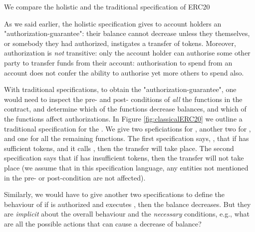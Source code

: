  
We compare the holistic and the traditional specification of ERC20

As we said earlier,  the holistic specification gives to account holders an
 "authorization-guarantee": their balance cannot decrease unless they
 themselves, or somebody they had authorized, instigates a transfer of
 tokens. Moreover, authorization is {\em not} transitive: only the
 account holder can authorise some other party to transfer funds from
 their account: authorisation to spend from an account does not confer
 the ability to authorise yet more others to spend also.
 
 With traditional  specifications, to obtain the "authorization-guarantee", 
one would need to inspect the pre- and post- conditions of {\em all} the functions
in the contract, and determine which of the functions decrease balances, and which of the functions 
 affect authorizations.
In Figure \ref{fig:classicalERC20} we outline a traditional specification for the .
We give two speficiations for , another two for , and one for all 
the remaining functions. The  first specification says, \eg, that if  
  has sufficient tokens, and it calls , then the transfer will take place.  
The second specification says that  if  has insufficient tokens, then 
the transfer will not take place (we assume that in this
specification language, any entities not mentioned in the pre- or post-condition 
are not affected).
 
 Similarly, we would have to give another two specifications to define the behaviour of 
if  is authorized and executes , then   the balance decreases. 
But they are {\em implicit} about the overall behaviour and the   {\em necessary} conditions,
e.g., what are all the possible actions that can cause a decrease of balance?


